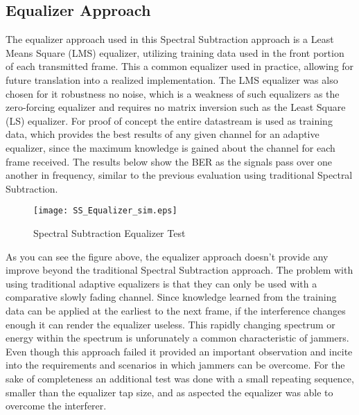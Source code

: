 \subsection{Equalizer Approach}

The equalizer approach used in this Spectral Subtraction approach is a Least Means Square (LMS) equalizer, utilizing training data used in the front portion of each transmitted frame.  This a common equalizer used in practice, allowing for future translation into a realized implementation.  The LMS equalizer was also chosen for it robustness no noise, which is a weakness of such equalizers as the zero-forcing equalizer and requires no matrix inversion such as the Least Square (LS) equalizer.  For proof of concept the entire datastream is used as training data, which provides the best results of any given channel for an adaptive equalizer, since the maximum knowledge is gained about the channel for each frame received.  The results below show the BER as the signals pass over one another in frequency, similar to the previous evaluation using traditional Spectral Subtraction.\\
  
\begin{figure}[!ht]\label{SS_equalizer}
\centering
\texttt{[image: SS\_Equalizer\_sim.eps]}
\caption{Spectral Subtraction Equalizer Test}
\end{figure} 

As you can see the figure above, the equalizer approach doesn't provide any improve beyond the traditional Spectral Subtraction approach.  The problem with using traditional adaptive equalizers is that they can only be used with a comparative slowly fading channel.  Since knowledge learned from the training data can be applied at the earliest to the next frame, if the interference changes enough it can render the equalizer useless.  This rapidly changing spectrum or energy within the spectrum is unforunately a common characteristic of jammers.  Even though this approach failed it provided an important observation and incite into the requirements and scenarios in which jammers can be overcome.  For the sake of completeness an additional test was done with a small repeating sequence, smaller than the equalizer tap size, and as aspected the equalizer was able to overcome the interferer.\\



